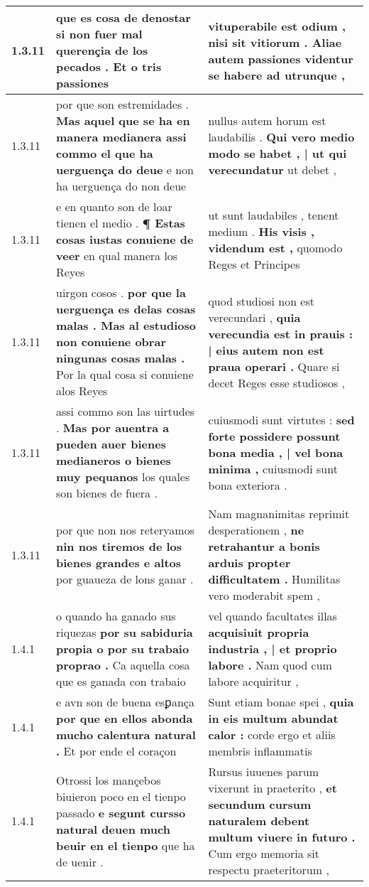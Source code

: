 \begin{tabular}{|p{1cm}|p{6.5cm}|p{6.5cm}|}
1.3.11 & que es cosa de denostar \textbf{ si non fuer mal querençia de los pecados . } Et o tris passiones & vituperabile est odium , \textbf{ nisi sit vitiorum . } Aliae autem passiones videntur se habere ad utrunque , \\\hline
1.3.11 & por que son estremidades . \textbf{ Mas aquel que se ha en manera medianera assi commo el que ha uerguença do deue } e non ha uerguença do non deue & nullus autem horum est laudabilis . \textbf{ Qui vero medio modo se habet , | ut qui verecundatur } ut debet , \\\hline
1.3.11 & e en quanto son de loar tienen el medio . \textbf{ ¶ Estas cosas iustas conuiene de veer } en qual manera los Reyes & ut sunt laudabiles , tenent medium . \textbf{ His visis , videndum est , } quomodo Reges et Principes \\\hline
1.3.11 & uirgon cosos . \textbf{ por que la uerguença es delas cosas malas . Mas al estudioso non conuiene obrar ningunas cosas malas . } Por la qual cosa si conuiene alos Reyes & quod studiosi non est verecundari , \textbf{ quia verecundia est in prauis : | eius autem non est praua operari . } Quare si decet Reges esse studiosos , \\\hline
1.3.11 & assi commo son las uirtudes . \textbf{ Mas por auentra a pueden auer bienes medianeros o bienes muy pequanos } los quales son bienes de fuera . & cuiusmodi sunt virtutes : \textbf{ sed forte possidere possunt bona media , | vel bona minima , } cuiusmodi sunt bona exteriora . \\\hline
1.3.11 & por que non nos reteryamos \textbf{ nin nos tiremos de los bienes grandes e altos } por guaueza de lons ganar . & Nam magnanimitas reprimit desperationem , \textbf{ ne retrahantur a bonis arduis propter difficultatem . } Humilitas vero moderabit spem , \\\hline
1.4.1 & o quando ha ganado sus riquezas \textbf{ por su sabiduria propia o por su trabaio proprao . } Ca aquella cosa que es ganada con trabaio & vel quando facultates illas \textbf{ acquisiuit propria industria , | et proprio labore . } Nam quod cum labore acquiritur , \\\hline
1.4.1 & e avn son de buena esꝑança \textbf{ por que en ellos abonda mucho calentura natural . } Et por ende el coraçon & Sunt etiam bonae spei , \textbf{ quia in eis multum abundat calor : } corde ergo et aliis membris inflammatis \\\hline
1.4.1 & Otrossi los mançebos biuieron poco en el tienpo passado \textbf{ e segunt cursso natural deuen much beuir en el tienpo } que ha de uenir . & Rursus iuuenes parum vixerunt in praeterito , \textbf{ et secundum cursum naturalem debent multum viuere in futuro . } Cum ergo memoria sit respectu praeteritorum , \\\hline

\end{tabular}
